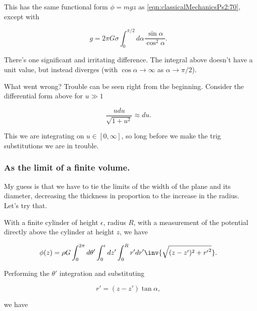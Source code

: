 This has the same functional form $\phi = m g z$ as \ref{eqn:classicalMechanicsPs2:70}, except with

\begin{equation}\label{eqn:classicalMechanicsPs2:190}
g = 2 \pi G \sigma \int_0^{\pi/2} d\alpha \frac{\sin \alpha}{\cos^2 \alpha}.
\end{equation}

There's one significant and irritating difference.  The integral above doesn't have a unit value, but instead diverges (with $\cos\alpha \rightarrow \infty$ as $\alpha \rightarrow \pi/2$).

What went wrong?  Trouble can be seen right from the beginning.  Consider the differential form above for $u \gg 1$

\begin{equation}\label{eqn:classicalMechanicsPs2:210}
\frac{u du}{\sqrt{1 + u^2}} \approx du.
\end{equation}

This we are integrating on $u \in [0, \infty]$, so long before we make the trig substitutions we are in trouble.  

\subsubsection{As the limit of a finite volume.}

My guess is that we have to tie the limits of the width of the plane and its diameter, decreasing the thickness in proportion to the increase in the radius.  Let's try that.

With a finite cylinder of height $\epsilon$, radius $R$, with a measurement of the potential directly above the cylinder at height $z$, we have

\begin{equation}\label{eqn:classicalMechanicsPs2:230}
\phi(z) 
= \rho G \int_0^{2\pi} d\theta' \int_0^\epsilon dz' \int_0^R r' dr' \inv{\sqrt{(z-z')^2 + {r'}^2}}.
\end{equation}

Performing the $\theta'$ integration and substituting

\begin{equation}\label{eqn:classicalMechanicsPs2:250}
r' = (z - z') \tan\alpha,
\end{equation}

we have

